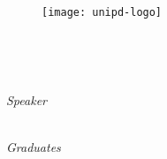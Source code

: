 \begin{titlepage}
    \begin{center}
        \begin{LARGE}
            \textbf{\myUni}\\
        \end{LARGE}

        \vspace{10pt}

        \begin{Large}
            \textsc{\myDepartment}\\
        \end{Large}

        \vspace{10pt}

        \begin{large}
            \textsc{\myFaculty}\\
        \end{large}

        \vspace{30pt}
        \begin{figure}[htbp]
            \centering
            \texttt{[image: unipd-logo]}
        \end{figure}
        \vspace{30pt}

        \begin{LARGE}
            \textbf{\myTitle}\\
        \end{LARGE}

        \vspace{10pt}

        \begin{large}
            \textsl{\myDegree}\\
        \end{large}

        \vspace{40pt}

        \begin{large}
            \begin{flushleft}
                \textit{Speaker}\\
                \vspace{5pt}
                \profTitle\ \myProf
            \end{flushleft}
             \vspace{-52pt}

            \begin{flushright}
                \textit{Graduates}\\
                \vspace{5pt}
                \myName \\
                \vspace{5pt}
            \end{flushright}
        \end{large}


\end{center}
\end{titlepage}
